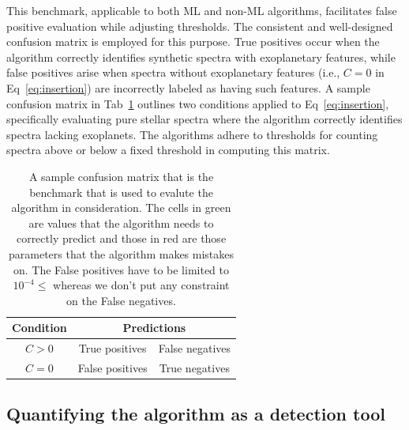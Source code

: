 This benchmark, applicable to both ML and non-ML algorithms, facilitates false positive evaluation while adjusting thresholds. The consistent and well-designed confusion matrix is employed for this purpose. True positives occur when the algorithm correctly identifies synthetic spectra with exoplanetary features, while false positives arise when spectra without exoplanetary features (i.e., $C=0$ in Eq~\ref{eq:insertion}) are incorrectly labeled as having such features. A sample confusion matrix in Tab~\ref{tab:sample_cm} outlines two conditions applied to Eq~\ref{eq:insertion}, specifically evaluating pure stellar spectra where the algorithm correctly identifies spectra lacking exoplanets. The algorithms adhere to thresholds for counting spectra above or below a fixed threshold in computing this matrix.
\begin{table}[ht!]
    \centering
    \begin{tabular}{|c|c|c|}
    \hline
    Condition&  \multicolumn{2}{|c|}{ Predictions}\\
    \hline
        $C>0$ &\cellcolor{green!50}  True positives& \cellcolor{red!50}False negatives\\
        \hline
        $C=0$ &  \cellcolor{red!50}False positives& \cellcolor{green!50}True negatives\\
        \hline
    \end{tabular}
    \caption{A sample confusion matrix that is the benchmark that is used to evalute the algorithm in consideration. 
    The cells in green are values that the algorithm needs to correctly predict and those in red are those parameters that the algorithm makes mistakes on.
    The False positives have to be limited to $10^{-4}\le$ whereas we don't put any constraint on the False negatives.}
    \label{tab:sample_cm}
\end{table}
\subsection{Quantifying the algorithm as a detection tool}

